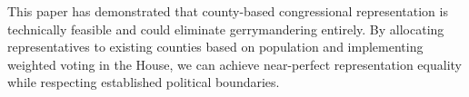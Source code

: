 

This paper has demonstrated that county-based congressional representation is technically feasible and could eliminate gerrymandering entirely. By allocating representatives to existing counties based on population and implementing weighted voting in the House, we can achieve near-perfect representation equality while respecting established political boundaries.

